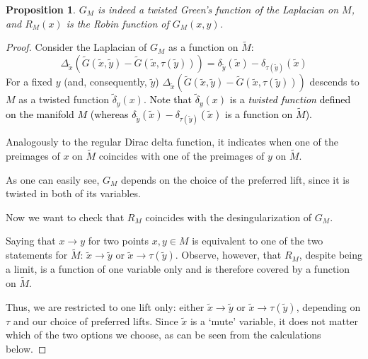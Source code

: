 \documentclass[10pt,a4paper]{amsart}
\newtheorem{prop}{Proposition}
\def\Gt{\widetilde{G}}
\def\Mt{\widetilde{M}}
\def\xt{\tilde{x}}
\def\yt{\tilde{y}}
\begin{document}
\begin{prop}
\label{st: green function and robin function}
 $G_M$ is indeed  a twisted Green's function of the Laplacian on $M$, and $R_M(x)$ is the Robin function of $G_M(x,y)$.
\end{prop}

\begin{proof}


Consider the Laplacian of $G_M$ as a function on $\Mt$:
\[
\Delta_{\xt}\left( \Gt(\xt,\yt) -\Gt(\xt,\tau(\yt))\right) = \delta_{\yt}(\xt) - \delta_{\tau(\yt)}(\xt)  
\]
For a fixed $y$ (and, consequently, $\yt$) $\Delta_{\xt}\left(\Gt(\xt,\yt) -\Gt(\xt,\tau(\yt))\right)$ descends to $M$ as a twisted function $\widetilde{\delta}_y(x)$. \textcolor{black}{Note that $\widetilde{\delta}_y(x)$ is a \textit{twisted function} defined on the manifold $M$ (whereas $\delta_{\yt}(\xt) - \delta_{\tau(\yt)}(\xt)$ is a function on $\Mt$).} 

Analogously to the regular Dirac delta function, it indicates when one of the preimages of $x$ on $\Mt$ coincides with one of the preimages of $y$ on $\Mt$.  

As one can easily see, $G_M$ depends on the choice of the preferred lift, since it is twisted in both of its variables. 

Now we want to check that $R_M$ coincides with the desingularization of $G_M$.

Saying  that $x\to y$ for two points $x,y\in M$ is equivalent to one of the two statements for $\Mt$: $\xt\to \yt$ or $\xt\to \tau(\yt)$. Observe, however, that  $R_M$, despite being a limit, is a function of one variable only and is therefore covered by a function on $\Mt$. 

 Thus, we are restricted to one lift only: either $\xt\to \yt$ or $\xt\to \tau(\yt)$, depending on $\tau$ and our choice of preferred lifts. Since $\xt$ is a `mute' variable, it does not matter which of the two options we choose, as can be seen from the calculations  below.







\end{proof}
\end{document}
